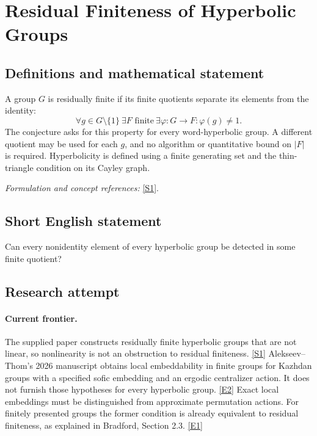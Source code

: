 \documentclass[11pt,a4paper]{article}
\newcommand{\sref}[2]{\hyperlink{source:#1:#2}{[S#2]}}
\newcommand{\eref}[2]{\hyperlink{extra:#1:#2}{[E#2]}}
\newif\ifshowcatalogue
\newcommand{\cataloguescope}[1]{\ifshowcatalogue
 \paragraph{Exact scope in the supplied catalogue.}
 \begin{quote}\small #1\end{quote}\fi}
\numberwithin{equation}{section}
\begin{document}
\setcounter{section}{0}
\clearpage
\section*{\texorpdfstring{Residual Finiteness of Hyperbolic Groups}{Residual Finiteness of Hyperbolic Groups}}\label{30006750}
\subsection{Definitions and mathematical statement}
A group $G$ is residually finite if its finite quotients separate its elements from the identity:
\[
 \forall g\in G\setminus\{1\}\ \exists F\text{ finite}\ \exists\varphi:G\to F:
 \varphi(g)\ne1.
\]
The conjecture asks for this property for every word-hyperbolic group. A different quotient may be used for each $g$, and no algorithm or quantitative bound on $|F|$ is required. Hyperbolicity is defined using a finite generating set and the thin-triangle condition on its Cayley graph.
\par\smallskip\textit{Formulation and concept references:} \sref{30006750}{1}.
\cataloguescope{For every word-hyperbolic group G and every nonidentity element g in G, prove that there is a finite group F and a homomorphism \ensuremath{\varphi}:G\ensuremath{\to}F with \ensuremath{\varphi}(g)\ensuremath{\ne}1.}
\subsection{Short English statement}
Can every nonidentity element of every hyperbolic group be detected in some finite quotient?
\subsection{Research attempt}

\paragraph{Current frontier.}
The supplied paper constructs residually finite hyperbolic groups that are
not linear, so nonlinearity is not an obstruction to residual finiteness.
\sref{30006750}{1} Alekseev--Thom's 2026 manuscript obtains local embeddability
in finite groups for Kazhdan groups with a specified sofic embedding and an
ergodic centralizer action. It does not furnish those hypotheses for every
hyperbolic group. \eref{30006750}{2} Exact local embeddings must be distinguished
from approximate permutation actions. For finitely presented groups the
former condition is already equivalent to residual finiteness, as explained
in Bradford, Section 2.3. \eref{30006750}{1}
\end{document}
